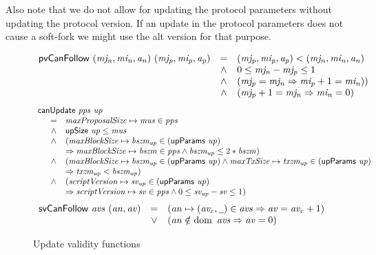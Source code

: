 Also note that we do not allow for updating the protocol parameters without
updating the protocol version. If an update in the protocol parameters does not
cause a soft-fork we might use the alt version for that purpose.

\begin{figure}[htb]
  \begin{equation}
    \label{eq:func:pv-can-follow}
    \begin{array}{r c l}
      \mathsf{pvCanFollow}~(\mathit{mj_n}, \mathit{mi_n}, \mathit{a_n})~(\mathit{mj_p}, \mathit{mi_p}, \mathit{a_p})
      & = & (\mathit{mj_p}, \mathit{mi_p}, \mathit{a_p}) < (\mathit{mj_n}, \mathit{mi_n}, \mathit{a_n})\\
      & \wedge & 0 \leq \mathit{mj_n} - \mathit{mj_p} \leq 1\\
      & \wedge & (\mathit{mj_p} = \mathit{mj_n} \Rightarrow \mathit{mi_p} + 1 = \mathit{mi_n}))\\
      & \wedge & (\mathit{mj_p} + 1 = \mathit{mj_n} \Rightarrow \mathit{mi_n} = 0)
    \end{array}
  \end{equation}
  \nextdef
  \begin{equation}
    \label{eq:func:can-update}
    \begin{array}{l}
      \mathsf{canUpdate}~\mathit{pps}~\mathit{up}\\
      {\begin{array}{r c l}
         & = & \mathit{maxProposalSize} \mapsto \mathit{mus} \in \mathit{pps}\\
         & \wedge & \mathsf{upSize}~\mathit{up} \leq \mathit{mus}\\
         & \wedge & (\mathit{maxBlockSize} \mapsto \mathit{bszm_{up}} \in (\mathsf{upParams}~\mathit{up})\\
         & & \Rightarrow \mathit{maxBlockSize} \mapsto \mathit{bszm} \in \mathit{pps}
             \wedge  \mathit{bszm_{up}} \leq 2*\mathit{bszm})\\
         & \wedge & (\mathit{maxBlockSize} \mapsto \mathit{bszm_{up}} \in (\mathsf{upParams}~\mathit{up})
         \wedge \mathit{maxTxSize} \mapsto \mathit{txzm_{up}} \in (\mathsf{upParams}~\mathit{up})\\
         & & \Rightarrow \mathit{txzm_{up}} < \mathit{bszm_{up}})\\
         & \wedge & (\mathit{scriptVersion} \mapsto \mathit{sv_{up}} \in (\mathsf{upParams}~\mathit{up}) \\
         & & \Rightarrow \mathit{scriptVersion} \mapsto \mathit{sv} \in \mathit{pps}
             \wedge  0 \leq \mathit{sv_{up}} - \mathit{sv} \leq 1)
       \end{array}}
    \end{array}
  \end{equation}
  \nextdef
  \begin{equation}
    \label{eq:func:av-can-follow}
    \begin{array}{r c l}
      \fun{svCanFollow}~\var{avs}~(\var{an}, \var{av}) & =
      & (\var{an} \mapsto (\var{av_c}, \wcard) \in \var{avs}
        \Rightarrow \var{av} = \var{av_c} + 1)\\
      & \vee & (\var{an} \notin \dom~\var{avs} \Rightarrow \var{av} = 0)
    \end{array}
  \end{equation}
  \caption{Update validity functions}
\end{figure}

